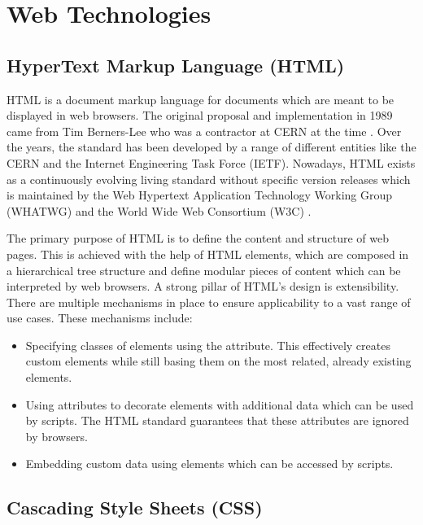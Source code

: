 \chapter{Web Technologies}
\label{chap:WebTechnologies}

\section{HyperText Markup Language (HTML)}
\label{sec:HTML}

HTML is a document markup language for documents which are meant to be displayed in web browsers.
The original proposal and implementation in 1989 came from Tim Berners-Lee who was a contractor at CERN at the time \parencite{TBLProposal}.
Over the years, the standard has been developed by a range of different entities like the CERN and the Internet Engineering Task Force (IETF). 
Nowadays, HTML exists as a continuously evolving living standard without specific version releases which is maintained by the Web Hypertext Application Technology Working Group (WHATWG) and the World Wide Web Consortium (W3C) \parencite{HTML}.

The primary purpose of HTML is to define the content and structure of web pages.
This is achieved with the help of HTML elements, which are composed in a hierarchical tree structure and define modular pieces of content which can be interpreted by web browsers.
A strong pillar of HTML's design is extensibility. 
There are multiple mechanisms in place to ensure applicability to a vast range of use cases.
These mechanisms include:

\begin{itemize}
\item Specifying classes of elements using the  attribute.
This effectively creates custom elements while still basing them on the most related, already existing elements.

\item Using  attributes to decorate elements with additional data which can be used by scripts.
The HTML standard guarantees that these attributes are ignored by browsers.

\item Embedding custom data using  elements which can be accessed by scripts.
\end{itemize}


\section{Cascading Style Sheets (CSS)}
\label{sec:CSS}

